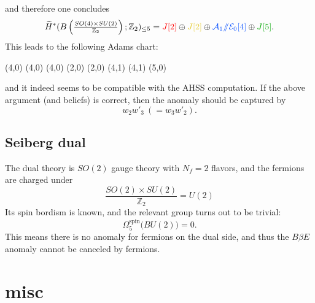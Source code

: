 \documentclass[12pt]{article}
\numberwithin{equation}{section}
\newcommand*{\colorA}[1]{\textcolor{colorA}{#1}}
\newcommand*{\colorB}[1]{\textcolor{colorB}{#1}}
\newcommand*{\colorC}[1]{\textcolor{colorC}{#1}}
\newcommand*{\colorD}[1]{\textcolor{colorD}{#1}}
\def\bZ{\mathbb{Z}}
\begin{document}
and therefore one concludes
\begin{equation}
	\widetilde H^\ast(B\left(\tfrac{SO(4)\times SU(2)}{\bZ_2}\right);\bZ_2)_{\leq 5} = \colorA{J[2]} \oplus \colorC{J[2]} \oplus \colorB{\mathcal{A}_1/\!\!/\mathcal{E}_0[4]} \oplus \colorD{J[5]}.
\end{equation}
This leads to the following Adams chart:
\begin{center}
	\begin{sseqdata}[
		name=M,
		Adams grading,
		classes = fill,
		xrange = {0}{5},
		yrange = {0}{3},
	]
		\tower[colorB](4,0)
		\class[white](4,0)
		\class[white](4,0)
		\class[colorA](2,0)
		\class[colorC](2,0)
		\tower[colorA](4,1)
		\tower[colorC](4,1)
		\class[colorD](5,0)
	\end{sseqdata}
	\printpage[name = M,page = 2]
\end{center}
and it indeed seems to be compatible with the AHSS computation.
If the above argument (and beliefs) is correct, then the anomaly should be captured by
\begin{equation}
	w_2w'_3\ (= w_3w'_2).
\end{equation}

\subsection{Seiberg dual}
The dual theory is $SO(2)$ gauge theory with $N_f = 2$ flavors, and the fermions are charged under
\begin{equation}
	\frac{SO(2)\times SU(2)}{\bZ_2}
	=
	U(2)
\end{equation}
Its spin bordism is known, and the relevant group turns out to be trivial:
\begin{equation}
	\Omega_5^{\mathrm{spin}}\big(BU(2)\big) = 0.
\end{equation}
This means there is no anomaly for fermions on the dual side,
and thus the $B\beta E$ anomaly cannot be canceled by fermions.

\newpage

\section{misc}
\end{document}
